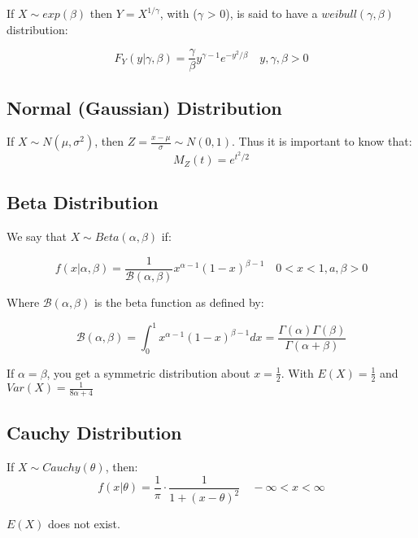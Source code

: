 \documentclass{article}
\begin{document}
If $X \sim exp(\beta)$ then $Y = X^{1/\gamma}$, with ($\gamma$ > 0), is said to have a $weibull(\gamma,\beta)$ distribution:

\begin{equation*}
    F_Y(y|\gamma,\beta) = \frac{\gamma}{\beta} y^{\gamma-1} e^{-y^2/\beta} \quad y, \gamma, \beta > 0
\end{equation*}

\subsection{Normal (Gaussian) Distribution}

If $X \sim N(\mu,\sigma^2)$, then $Z = \frac{x-\mu}{\sigma} \sim N(0,1)$. Thus it is important to know that:
\begin{equation*}
    M_Z(t) = e^{t^2/2}
\end{equation*}

\subsection{Beta Distribution}

We say that $X \sim Beta(\alpha,\beta)$ if:

\begin{equation*}
    f(x|\alpha,\beta) = \frac{1}{\mathcal{B}(\alpha,\beta)} x^{\alpha-1} (1-x)^{\beta-1} \quad 0<x<1, a,\beta >0
\end{equation*}

Where $\mathcal{B}(\alpha,\beta)$ is the beta function as defined by:

\begin{equation*}
    \mathcal{B}(\alpha,\beta) = \int_0^1 x^{\alpha-1}(1-x)^{\beta-1} dx = \frac{\Gamma(\alpha)\Gamma(\beta)}{\Gamma(\alpha+\beta)}    
\end{equation*}

If $\alpha = \beta$, you get a symmetric distribution about $x = \frac{1}{2}$. With $E(X) = \frac{1}{2}$ and $Var(X) = \frac{1}{8\alpha + 4}$

\subsection{Cauchy Distribution}

If $X \sim Cauchy(\theta)$, then:
\begin{equation*}
    f(x|\theta) = \frac{1}{\pi} \cdot \frac{1}{1+(x-\theta)^2} \quad -\infty < x < \infty
\end{equation*}

$E(X)$ does not exist. 
\end{document}
